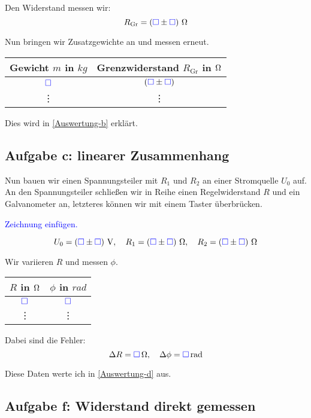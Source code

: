 \documentclass[11pt, ngerman]{article}
\newcommand{\emesswert}{\left(\messwert \pm \messwert \right)}
\newcommand{\messwert}{\textcolor{blue}{\square}}
\begin{document}
Den Widerstand messen wir:
\[ R_\text{Gr} = \unit[\emesswert] \Omega \]

Nun bringen wir Zusatzgewichte an und messen erneut.

\begin{table}[h!]
	\centering

	\begin{tabular}{cc}
		Gewicht $m$ in $\unit{kg}$ & Grenzwiderstand $R_\text{Gr}$ in $\unit \Omega$ \\
		\hline
		$\messwert$ & $\emesswert$ \\
		\vdots & \vdots
	\end{tabular}
\end{table}

Dies wird in \ref{Auswertung-b} erklärt.

\subsection{Aufgabe c: linearer Zusammenhang}

\label{Durchführung-c}

Nun bauen wir einen Spannungsteiler mit $R_1$ und $R_2$ an einer Stromquelle
$U_0$ auf. An den Spannungsteiler schließen wir in Reihe einen Regelwiderstand
$R$ und ein Galvanometer an, letzteres können wir mit einem Taster überbrücken.

\textcolor{blue}{Zeichnung einfügen.}

\[
	U_0 = \unit[\emesswert] V
	, \quad
	R_1 = \unit[\emesswert] \Omega
	, \quad
	R_2 = \unit[\emesswert] \Omega
\]

Wir variieren $R$ und messen $\phi$.

\begin{table}[h!]
	\centering

	\begin{tabular}{cc}
		$R$ in $\unit \Omega$ & $\phi$ in $\unit{rad}$ \\
		\hline
		$\messwert$ & $\messwert$ \\
		\vdots & \vdots
	\end{tabular}
\end{table}

Dabei sind die Fehler:
\[
	\Delta R = \unit[\messwert] \Omega
	, \quad
	\Delta \phi = \unit[\messwert]{rad}
\]

Diese Daten werte ich in \ref{Auswertung-d} aus.

\subsection{Aufgabe f: Widerstand direkt gemessen}
\end{document}
